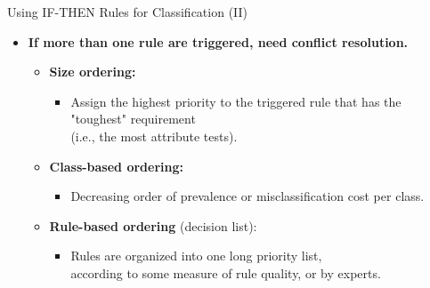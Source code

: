 \begin{frame}{Using \uppercase{if-then} Rules for Classification (II)}
  \begin{itemize}
  \item \textbf{If more than one rule are triggered, need {\color{airforceblue}conflict resolution}.}
    \begin{itemize}
    \item \textbf{\color{airforceblue}Size ordering:}
      \begin{itemize}
      \item Assign the highest priority to the triggered rule that has the "toughest" requirement \\ (i.e., the most attribute tests).
      \end{itemize}
    \item \textbf{\color{airforceblue}Class-based ordering:}
      \begin{itemize}
      \item Decreasing order of prevalence or misclassification cost per class.
      \end{itemize}
    \item \textbf{\color{airforceblue}Rule-based ordering} (decision list):
      \begin{itemize}
      \item Rules are organized into one long priority list,\\
        according to some measure of rule quality, or by experts.
      \end{itemize}
    \end{itemize}
  \end{itemize}
\end{frame}

